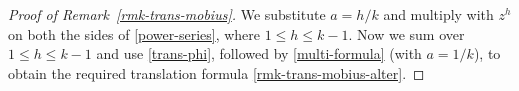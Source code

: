 \documentclass[12pt]{amsart}
\newcommand{\thmref}[1]{Theorem~\ref{#1}}
\newcommand{\lemref}[1]{Lemma~\ref{#1}}
\newcommand{\rmkref}[1]{Remark~\ref{#1}}
\begin{document}

\begin{proof}[Proof of \rmkref{rmk-trans-mobius}]
We substitute $a=h/k$ and multiply with $z^h$ on both the sides of \eqref{power-series}, where $1\leq h\leq k-1$.
Now we sum over $1\leq h\leq k-1$ and use \eqref{trans-phi}, followed by \eqref{multi-formula} (with $a=1/k$),
to obtain the required translation formula \eqref{rmk-trans-mobius-alter}.
 \end{proof}
\end{document}
